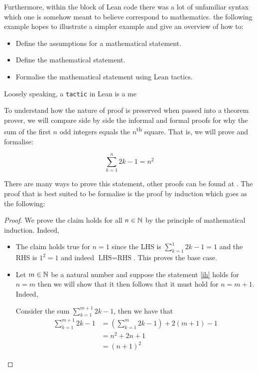Furthermore, within the block of Lean code there was a lot of unfamiliar syntax which one is somehow meant to believe correspond to mathematics. the following example hopes to
illustrate a simpler example and give an overview of how to:

\begin{itemize}
    \item Define the assumptions for a mathematical statement.
    \item Define the mathematical statement.
    \item Formalise the mathematical statement using Lean tactics.
\end{itemize}

Loosely speaking, a \texttt{tactic} in Lean is a me

\begin{example}
    To understand how the nature of proof is preserved when passed into a theorem prover, we will compare side by side the informal and formal proofs 
    for why the sum of the first $n$ odd integers equals the $n$\textsuperscript{th} square. That is, we will prove and formalise:

    \begin{equation}\label{ih}
        \sum_{k = 1}^{n} 2k - 1 = n^2
    \end{equation}

    There are many ways to prove this statement, other proofs can be found at \cite{sangwin}. The proof that is best suited to be formalise is the
    proof by induction which goes as the following:

    \begin{proof}
        We prove the claim holds for all $n \in \mathbb{N}$ by the principle of mathematical induction. Indeed,

        \begin{itemize}
            \item The claim holds true for $n = 1$ since the LHS is $\sum_{k = 1}^{1} 2k -1 = 1$ and the RHS is $1^2 = 1$ and indeed $\textrm{LHS} = \textrm{RHS}$. This proves the base case.
            
            \item Let $m \in \mathbb{N}$ be a natural number and suppose the statement \eqref{ih} holds for $n = m$ then we will show that it then follows that it must hold for $n = m + 1$. Indeed,
            
            Consider the sum $\sum_{k = 1}^{m + 1} 2k - 1$, then we have that
            \begin{align}
                \sum_{k = 1}^{m + 1} 2k - 1 &= \left(\sum_{k = 1}^{m} 2k - 1\right) + 2(m + 1) - 1 \tag{by definition of the summation}\\
                    &=  n^2 + 2n + 1 \tag{by the induction hypothesis}\\
                    &= (n + 1)^2
            \end{align}


\end{itemize}
\end{proof}
\end{example}
